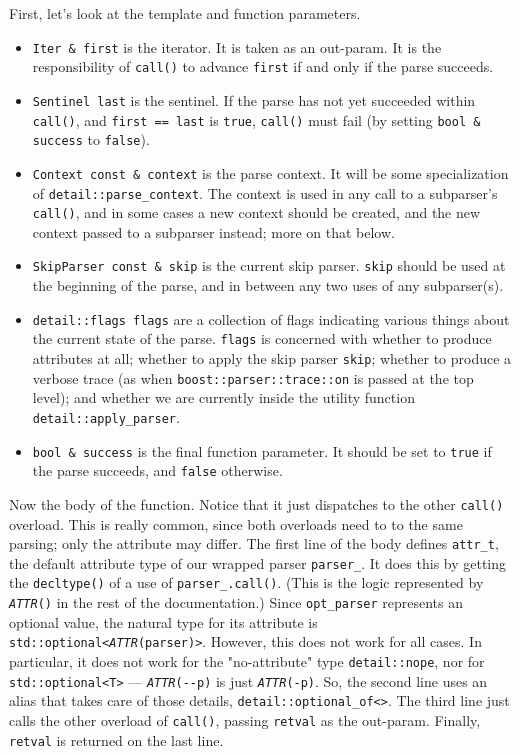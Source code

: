 First, let's look at the template and function parameters.

\begin{itemize}
\item
  \texttt{Iter \& first} is the iterator. It is taken as an out-param. It is the responsibility of \texttt{call()} to advance \texttt{first} if and only if the parse succeeds.
\item
  \texttt{Sentinel last} is the sentinel. If the parse has not yet succeeded within \texttt{call()}, and \texttt{first == last} is \texttt{true}, \texttt{call()} must fail (by setting \texttt{bool \& success} to \texttt{false}).
\item
  \texttt{Context const \& context} is the parse context. It will be some specialization of \texttt{detail::parse\_context}. The context is used in any call to a subparser's \texttt{call()}, and in some cases a new context should be created, and the new context passed to a subparser instead; more on that below.
\item
  \texttt{SkipParser const \& skip} is the current skip parser. \texttt{skip} should be used at the beginning of the parse, and in between any two uses of any subparser(s).
\item
  \texttt{detail::flags flags} are a collection of flags indicating various things about the current state of the parse. \texttt{flags} is concerned with whether to produce attributes at all; whether to apply the skip parser \texttt{skip}; whether to produce a verbose trace (as when \texttt{boost::parser::trace::on} is passed at the top level); and whether we are currently inside the utility function \texttt{detail::apply\_parser}.
\item
  \texttt{bool \& success} is the final function parameter. It should be set to \texttt{true} if the parse succeeds, and \texttt{false} otherwise.
\end{itemize}

Now the body of the function. Notice that it just dispatches to the other \texttt{call()} overload. This is really common, since both overloads need to to the same parsing; only the attribute may differ. The first line of the body defines \texttt{attr\_t}, the default attribute type of our wrapped parser \texttt{parser\_}. It does this by getting the \texttt{decltype()} of a use of \texttt{parser\_.call()}. (This is the logic represented by \emph{\texttt{ATTR}}\texttt{()} in the rest of the documentation.) Since \texttt{opt\_parser} represents an optional value, the natural type for its attribute is \texttt{std::optional<}\emph{\texttt{ATTR}}\texttt{(parser)>}. However, this does not work for all cases. In particular, it does not work for the "no-attribute" type \texttt{detail::nope}, nor for \texttt{std::optional<T>} --- \emph{\texttt{ATTR}}\texttt{(-\/-p)} is just \emph{\texttt{ATTR}}\texttt{(-p)}. So, the second line uses an alias that takes care of those details, \texttt{detail::optional\_of<>}. The third line just calls the other overload of \texttt{call()}, passing \texttt{retval} as the out-param. Finally, \texttt{retval} is returned on the last line.


